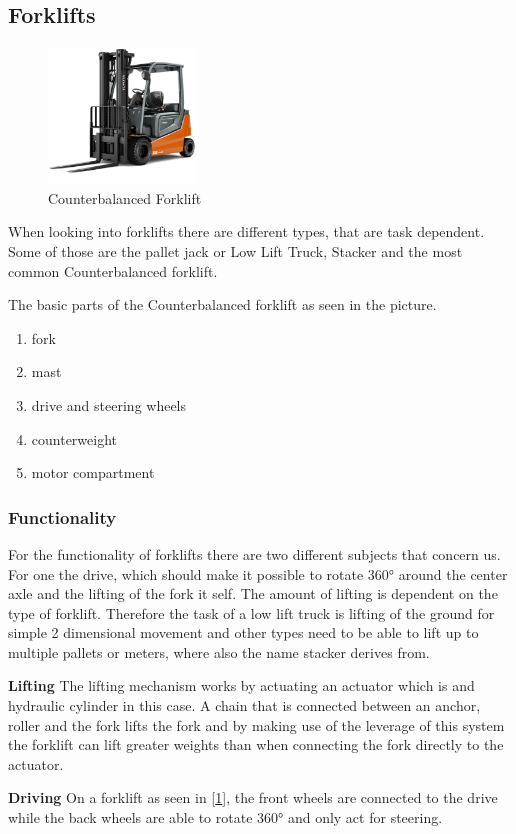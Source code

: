 \documentclass[../report.tex]{subfiles}
\begin{document}
\subsection{Forklifts}

\begin{figure}
    \includegraphics[width=0.35\textwidth]{../image/baltic.toyota-forklifts.jpeg}
    \caption{Counterbalanced Forklift}
    \label{fig:forklift}
\end{figure}
When looking into forklifts there are different types, that are task dependent.
Some of those are the pallet jack or Low Lift Truck, Stacker and the most common Counterbalanced forklift.

The basic parts of the Counterbalanced forklift as seen in the picture.
\begin{center}
    \begin{enumerate}
    \item fork
    \item mast
    \graphicspath{{\subfix{../image/}}}
    \item drive and steering wheels 
    \item counterweight
    \item motor compartment
    \end{enumerate}
\end{center}

\subsubsection{Functionality}
For the functionality of forklifts there are two different subjects that concern us.
For one the drive, which should make it possible to rotate 360° around the center axle
and the lifting of the fork it self.
The amount of lifting is dependent on the type of forklift. Therefore the task of a low lift 
truck is lifting of the ground for simple 2 dimensional movement and other types need
to be able to lift up to multiple pallets or meters, where also the name stacker derives from.

\textbf{Lifting}
The lifting mechanism works by actuating an actuator which is and hydraulic cylinder in this 
case. A chain that is connected between an anchor, roller and the fork lifts the fork and by 
making use of the leverage of this system the forklift can lift greater weights than when 
connecting the fork directly to the actuator.

\textbf{Driving}
On a forklift as seen in [\ref{fig:forklift}], the front wheels are connected to the drive
while the back wheels are able to rotate 360° and only act for steering.
\end{document}
